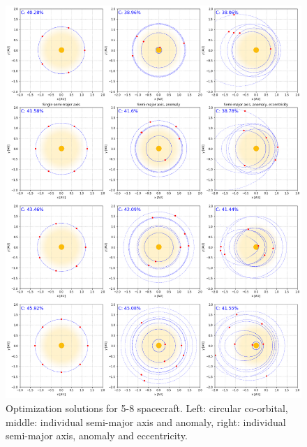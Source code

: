 \begin{figure}[p]
 \centering
 \includegraphics[width=1.0\textwidth]{img/appendix_orbit_2.png}
 \caption{Optimization solutions for 5-8 spacecraft. Left: circular co-orbital, middle: individual semi-major axis and anomaly, right: individual semi-major axis, anomaly and eccentricity.}
\end{figure}

